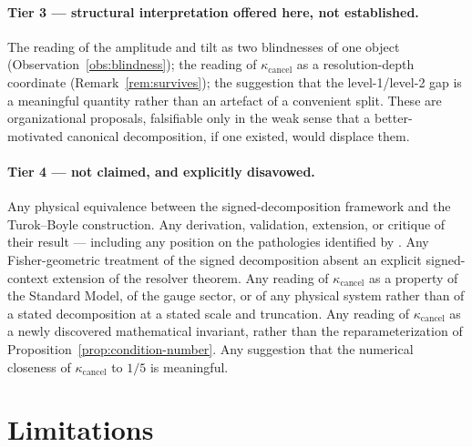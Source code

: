 \documentclass[11pt]{article}
\theoremstyle{definition}
\theoremstyle{remark}
\newcommand{\kcancel}{\kappa_{\mathrm{cancel}}}
\begin{document}
\paragraph{Tier 3 --- structural interpretation offered here, not established.} The reading of the
amplitude and tilt as two blindnesses of one object (Observation~\ref{obs:blindness}); the reading
of $\kcancel$ as a resolution-depth coordinate (Remark~\ref{rem:survives}); the suggestion that the
level-1/level-2 gap is a meaningful quantity rather than an artefact of a convenient split. These
are organizational proposals, falsifiable only in the weak sense that a better-motivated canonical
decomposition, if one existed, would displace them.

\paragraph{Tier 4 --- not claimed, and explicitly disavowed.} Any physical equivalence between the
signed-decomposition framework and the Turok--Boyle construction. Any derivation, validation,
extension, or critique of their result --- including any position on the pathologies identified by
\citet{ClineHell2026}. Any Fisher-geometric treatment of the signed decomposition absent an
explicit signed-context extension of the resolver theorem. Any reading of $\kcancel$ as a property
of the Standard Model, of the gauge sector, or of any physical system rather than of a stated
decomposition at a stated scale and truncation. Any reading of $\kcancel$ as a newly discovered
mathematical invariant, rather than the reparameterization of Proposition~\ref{prop:condition-number}.
Any suggestion that the numerical closeness of $\kcancel$ to $1/5$ is meaningful.

\section{Limitations}
\label{sec:limitations}
\end{document}

